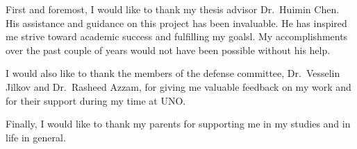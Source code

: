 First and foremost, I would like to thank my thesis advisor Dr.\ Huimin Chen. His assistance and guidance on this project has been invaluable. He has inspired me strive toward academic success and fulfilling my goalsl. My accomplishments over the past couple of years would not have been possible without his help.

I would also like to thank the members of the defense committee, Dr.\ Vesselin Jilkov and Dr.\ Rasheed Azzam, for giving me valuable feedback on my work and for their support during my time at UNO.

Finally, I would like to thank my parents for supporting me in my studies and in life in general.

%
%



